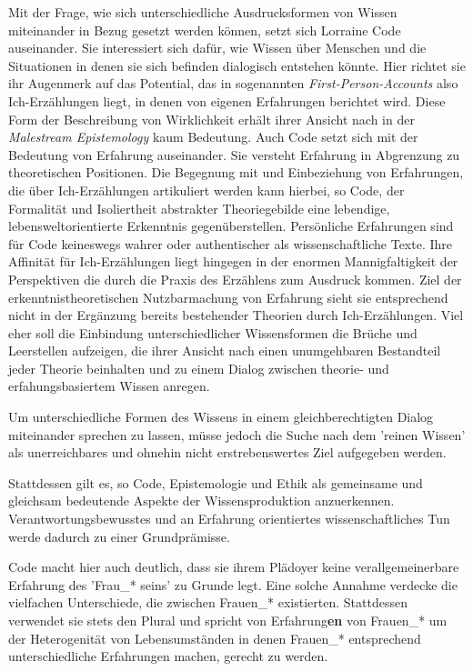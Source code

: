 Mit der Frage, wie sich unterschiedliche Ausdrucksformen von Wissen miteinander
in Bezug gesetzt werden können, setzt sich Lorraine Code auseinander. Sie
interessiert sich dafür,  wie Wissen über Menschen und die  Situationen in
denen sie sich befinden dialogisch entstehen könnte. Hier richtet sie ihr
Augenmerk auf das Potential, das in sogenannten \textit{First-Person-Accounts} also
Ich-Erzählungen liegt, in denen von eigenen Erfahrungen berichtet wird. Diese
Form der Beschreibung von Wirklichkeit erhält ihrer Ansicht nach in der
\textit{Malestream Epistemology} kaum Bedeutung.\footnotemark {} Auch Code setzt sich mit der Bedeutung von Erfahrung auseinander. Sie versteht Erfahrung in Abgrenzung zu theoretischen Positionen. 
Die Begegnung mit und Einbeziehung von Erfahrungen, die über Ich-Erzählungen
artikuliert werden kann hierbei, so Code,  der Formalität und Isoliertheit
abstrakter Theoriegebilde eine lebendige, lebensweltorientierte Erkenntnis
gegenüberstellen. Persönliche Erfahrungen sind für Code keineswegs wahrer oder
authentischer als wissenschaftliche Texte. Ihre Affinität für Ich-Erzählungen
liegt hingegen in der enormen Mannigfaltigkeit der Perspektiven die durch die
Praxis des Erzählens zum Ausdruck kommen. Ziel der erkenntnistheoretischen
Nutzbarmachung von Erfahrung sieht sie entsprechend nicht in der Ergänzung
bereits bestehender Theorien durch Ich-Erzählungen. Viel eher soll die
Einbindung unterschiedlicher Wissensformen die Brüche und Leerstellen aufzeigen,
die ihrer Ansicht nach einen unumgehbaren Bestandteil jeder Theorie beinhalten
und zu einem Dialog zwischen theorie- und erfahungsbasiertem Wissen anregen.

Um unterschiedliche Formen des Wissens in einem gleichberechtigten Dialog
miteinander sprechen zu lassen, müsse jedoch die Suche nach dem 'reinen Wissen'
als unerreichbares und ohnehin nicht erstrebenswertes Ziel aufgegeben
werden.\footnotemark {}

Stattdessen gilt es, so Code, Epistemologie und Ethik als gemeinsame und gleichsam bedeutende Aspekte der Wissensproduktion anzuerkennen. Verantwortungsbewusstes und an Erfahrung orientiertes wissenschaftliches Tun werde dadurch zu einer Grundprämisse.

Code macht hier auch deutlich, dass sie ihrem Plädoyer keine verallgemeinerbare
Erfahrung des 'Frau\_* seins' zu Grunde legt. Eine solche Annahme verdecke die
vielfachen Unterschiede, die zwischen Frauen\_* existierten. Stattdessen
verwendet sie stets den Plural und spricht von Erfahrung\textbf{en} von Frauen\_* um der
Heterogenität von Lebensumständen in denen Frauen\_* entsprechend
unterschiedliche Erfahrungen machen, gerecht zu werden.

